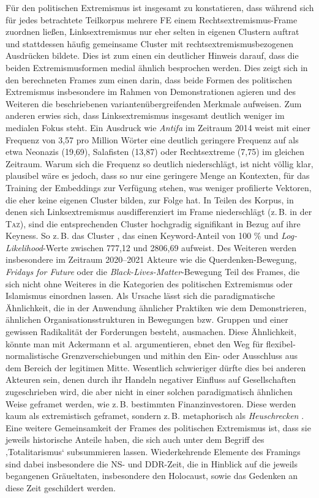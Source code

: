 Für den politischen Extremismus ist insgesamt zu konstatieren, dass während sich für jedes betrachtete Teilkorpus mehrere FE einem Rechtsextremismus-Frame zuordnen ließen, Linksextremismus nur eher selten in eigenen Clustern auftrat und stattdessen häufig gemeinsame Cluster mit rechtsextremismusbezogenen Ausdrücken bildete. Dies ist zum einen ein deutlicher Hinweis darauf, dass die beiden Extremismusformen medial ähnlich besprochen werden. Dies zeigt sich in den berechneten Frames zum einen darin, dass beide Formen des politischen Extremismus insbesondere im Rahmen von Demonstrationen agieren und des Weiteren die beschriebenen variantenübergreifenden Merkmale aufweisen. Zum anderen erwies sich, dass Linksextremismus insgesamt deutlich weniger im medialen Fokus steht. Ein Ausdruck wie \emph{Antifa} im Zeitraum 2014 weist mit einer Frequenz von 3,57 pro Million Wörter eine deutlich geringere Frequenz auf als etwa Neonazis (19,69), Salafisten (13,87) oder Rechtsextreme (7,75) im gleichen Zeitraum. Warum sich die Frequenz so deutlich niederschlägt, ist nicht völlig klar, plausibel wäre es jedoch, dass so nur eine geringere Menge an Kontexten, für das Training der Embeddings zur Verfügung stehen, was weniger profilierte Vektoren, die eher keine eigenen Cluster bilden, zur Folge hat. In Teilen des Korpus, in denen sich Linksextremismus ausdifferenziert im Frame niederschlägt (z.\,B. in der \textsc{Taz}), sind die entsprechenden Cluster hochgradig signifikant in Bezug auf ihre Keyness. So z.\,B. das Cluster , das einen Keyword-Anteil von 100 \% und \emph{Log-Likelihood}-Werte zwischen 777,12 und 2806,69 aufweist. Des Weiteren werden insbesondere im Zeitraum 2020--2021 Akteure wie die Querdenken-Bewegung, \emph{Fridays for Future} oder die \emph{Black-Lives-Matter}-Bewegung Teil des Frames, die sich nicht ohne Weiteres in die Kategorien des politischen Extremismus oder Islamismus einordnen lassen. Als Ursache lässt sich die paradigmatische Ähnlichkeit, die in der Anwendung ähnlicher Praktiken wie dem Demonstrieren, ähnlichen Organisationsstrukturen in Bewegungen bzw. Gruppen und einer gewissen Radikalität der Forderungen besteht, ausmachen. Diese Ähnlichkeit, könnte man mit Ackermann et al. \autocite*{ackermannMetamorphosenExtremismusbegriffesDiskursanalytische2015} argumentieren, ebnet den Weg für flexibel-normalistische Grenzverschiebungen und mithin den Ein- oder Ausschluss aus dem Bereich der legitimen Mitte. Wesentlich schwieriger dürfte dies bei anderen Akteuren sein, denen durch ihr Handeln negativer Einfluss auf Gesellschaften zugeschrieben wird, die aber nicht in einer solchen paradigmatisch ähnlichen Weise geframet werden, wie z.\,B. bestimmten Finanzinvestoren. Diese werden kaum als extremistisch geframet, sondern z.\,B. metaphorisch als \emph{Heuschrecken} \autocite{ziemFramesUndSprachliches2008}. Eine weitere Gemeinsamkeit der Frames des politischen Extremismus ist, dass sie jeweils historische Anteile haben, die sich auch unter dem Begriff des ‚Totalitarismus` subsummieren lassen. Wiederkehrende Elemente des Framings sind dabei insbesondere die NS- und DDR-Zeit, die in Hinblick auf die jeweils begangenen Gräueltaten, insbesondere den Holocaust, sowie das Gedenken an diese Zeit geschildert werden. 